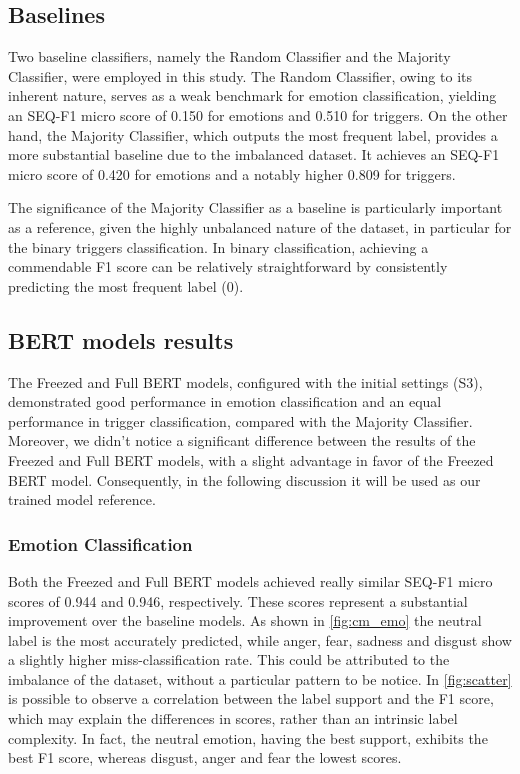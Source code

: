 \documentclass[11pt,table,xcdraw]{article}
\begin{document}
\subsection{Baselines}
Two baseline classifiers, namely the Random Classifier and the Majority Classifier, were employed in this study. The Random Classifier, owing to its inherent nature, serves as a weak benchmark for emotion classification, yielding an SEQ-F1 micro score of 0.150 for emotions and 0.510 for triggers. On the other hand, the Majority Classifier, which outputs the most frequent label, provides a more substantial baseline due to the imbalanced dataset. It achieves an SEQ-F1 micro score of 0.420 for emotions and a notably higher 0.809 for triggers.

The significance of the Majority Classifier as a baseline is particularly important as a reference, given the highly unbalanced nature of the dataset, in particular for the binary triggers classification. In binary classification, achieving a commendable F1 score can be relatively straightforward by consistently predicting the most frequent label (0). 

\subsection{BERT models results}
The Freezed and Full BERT models, configured with the initial settings (S3), demonstrated good performance in emotion classification and an equal performance in trigger classification, compared with the Majority Classifier. Moreover, we didn't notice a significant difference between the results of the Freezed and Full BERT models, with a slight advantage in favor of the Freezed BERT model. Consequently, in the following discussion it will be used as our trained model reference.

\subsubsection{Emotion Classification}
Both the Freezed and Full BERT models achieved really similar SEQ-F1 micro scores of 0.944 and 0.946, respectively. These scores represent a substantial improvement over the baseline models. As shown in \autoref{fig:cm_emo} the neutral label is the most accurately predicted, while anger, fear, sadness and disgust show a slightly higher miss-classification rate. This could be attributed to the imbalance of the dataset, without a particular pattern to be notice. In \autoref{fig:scatter} is possible to observe a correlation between the label support and the F1 score, which may explain the differences in scores, rather than an intrinsic label complexity. In fact, the neutral emotion, having the best support, exhibits the best F1 score, whereas disgust, anger and fear the lowest scores.
\end{document}
